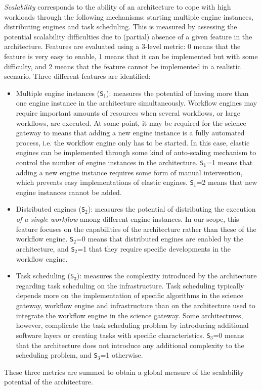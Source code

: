 \documentclass[preprint,3p,twocolumn]{elsarticle}
\begin{document}
\emph{Scalability} corresponds to the ability of an architecture to
cope with high workloads through the following mechanisms: starting multiple engine instances, distributing engines and task scheduling. 
This is measured by assessing the potential
scalability difficulties due to (partial) absence of a given feature in the architecture.  
Features are evaluated using a 3-level metric: 0 means that
the feature is very easy to enable, 1 means that it can be implemented
but with some difficulty, and 2 means that the feature cannot
 be implemented in a realistic scenario. Three different features are identified:
\begin{itemize}[leftmargin=0cm,itemindent=0.35cm,itemsep=0cm]
\item Multiple engine instances (\texttt{S$_1$}): measures the potential of having
  more than one engine instance in the architecture simultaneously. Workflow engines
  may require important amounts of resources when several workflows,
  or large workflows, are executed. At some point, it may be required
  for the science gateway to means that adding a new engine instance is a
  fully automated process, i.e. the workflow engine only has to be
  started. In this case, elastic engines can be implemented through some kind
  of auto-scaling mechanism to control the number
  of engine instances in the architecture. \texttt{S$_1$}=1 means that
  adding a new engine instance requires some form of manual
  intervention, which prevents easy
  implementations of elastic engines. \texttt{S$_1$}=2 means that new engine
  instances cannot be added.
\item Distributed engines (\texttt{S$_2$}): measures the potential of distributing
  the execution \emph{of a single workflow} among different engine
  instances. In our scope, this feature focuses on the capabilities of
  the architecture rather than these of the workflow
  engine. \texttt{S$_2$}=0 means that distributed engines are enabled by
  the architecture, and \texttt{S$_2$}=1 that they require specific
  developments in the workflow engine. 
\item Task scheduling (\texttt{S$_3$}): measures the complexity
  introduced by the architecture regarding task scheduling on
  the infrastructure. Task
  scheduling typically depends more on the implementation of specific
  algorithms in the science gateway, workflow engine and
  infrastructure than on the architecture used to integrate the
  workflow engine in the science gateway. Some architectures, however,
  complicate the task scheduling problem by introducing additional
  software layers or creating tasks with specific
  characteristics. \texttt{S$_3$}=0 means that the architecture does
  not introduce any additional complexity to the scheduling problem,
  and \texttt{S$_3$}=1 otherwise.
\end{itemize}
These three metrics are summed to obtain a global measure of the scalability
potential of the architecture.
\end{document}
